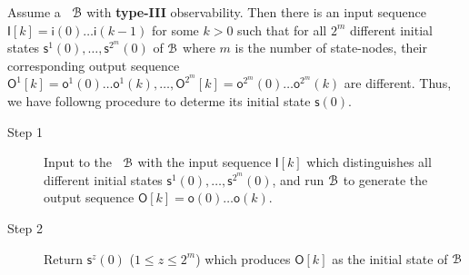 
Assume a \BCN\ ${\mathcal{B}}$  with {\bf type-III}  observability. Then there is an input sequence $\mathsf{I}[k]=\mathsf{i}(0)\ldots\mathsf{i}(k-1)$ for some $k>0$ such that for all ${2^m}$ different initial states $\mathsf{s}^1(0),\ldots, \mathsf{s}^{2^m}(0)$ of ${\mathcal{B}}$ where $m$ is the number of state-nodes, their corresponding output sequence $\mathsf{O}^1[k]=\mathsf{o}^1(0)\ldots\mathsf{o}^1(k),\ldots, \mathsf{O}^{2^m}[k]=\mathsf{o}^{2^m}(0)\ldots\mathsf{o}^{2^m}(k)$ are different. Thus, we have followng procedure to determe its initial state $\mathsf{s}(0)$.

 \begin{description}
	\item[Step 1]  Input to the \BCN\ ${\mathcal{B}}$ with the input sequence $\mathsf{I}[k]$ which distinguishes all different initial states $\mathsf{s}^1(0),\ldots, \mathsf{s}^{2^m}(0)$, and run ${\mathcal{B}}$ to generate the output sequence $\mathsf{O}[k]=\mathsf{o}(0)\ldots\mathsf{o}(k)$.
	\item[Step 2] Return $\mathsf{s}^z(0)$ ($1\le z\le{2^m}$) which produces $\mathsf{O}[k]$ as the initial state of ${\mathcal{B}}$ 
\end{description}

